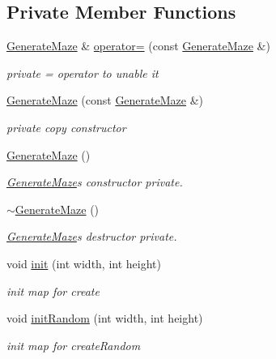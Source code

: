 \subsection*{Private Member Functions}
\begin{DoxyCompactItemize}
\item 
\hyperlink{class_generate_maze}{Generate\+Maze} \& \hyperlink{class_generate_maze_a8f367f5138321bebadd37f8f9ff08c29}{operator=} (const \hyperlink{class_generate_maze}{Generate\+Maze} \&)
\begin{DoxyCompactList}\small\item\em private = operator to unable it \end{DoxyCompactList}\item 
\hyperlink{class_generate_maze_aab170aa3141ef70c69c8e753fba22468}{Generate\+Maze} (const \hyperlink{class_generate_maze}{Generate\+Maze} \&)
\begin{DoxyCompactList}\small\item\em private copy constructor \end{DoxyCompactList}\item 
\hyperlink{class_generate_maze_a83710de04bb1b6b52668a2abde742e83}{Generate\+Maze} ()
\begin{DoxyCompactList}\small\item\em \hyperlink{class_generate_maze}{Generate\+Maze}\textquotesingle{}s constructor private. \end{DoxyCompactList}\item 
\hyperlink{class_generate_maze_a83513ab14774522438bb4620c289ed78}{$\sim$\+Generate\+Maze} ()
\begin{DoxyCompactList}\small\item\em \hyperlink{class_generate_maze}{Generate\+Maze}\textquotesingle{}s destructor private. \end{DoxyCompactList}\item 
void \hyperlink{class_generate_maze_aa199035f12556e690b7c980b7c9d358a}{init} (int width, int height)
\begin{DoxyCompactList}\small\item\em init map for create \end{DoxyCompactList}\item 
void \hyperlink{class_generate_maze_a8f21aa8627b9ced7a78138153d812316}{init\+Random} (int width, int height)
\begin{DoxyCompactList}\small\item\em init map for create\+Random \end{DoxyCompactList}\item 

\end{DoxyCompactItemize}
